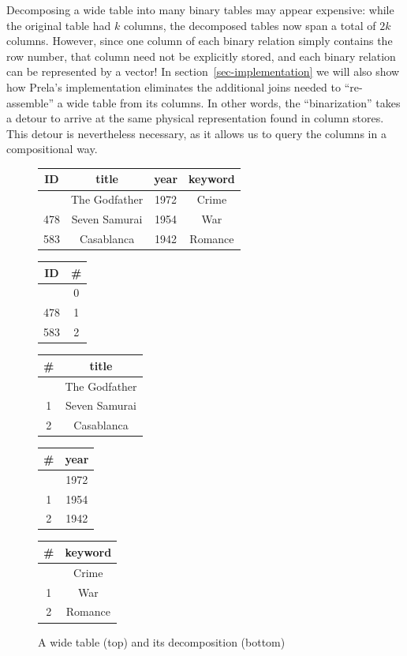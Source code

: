 \documentclass[sigconf,screen,pbalance]{cidr-2027}
\newenvironment{reltable}[1]
  {\begingroup\setlength{\arrayrulewidth}{0.5pt}\setlength{\tabcolsep}{4pt}%
   \renewcommand{\arraystretch}{0.95}\begin{tabular}{#1}\hline}
  {\\\hline\end{tabular}\endgroup}
\newcommand{\headergap}{\\\hline\noalign{\vskip 2pt}\hline}
\begin{document}
Decomposing a wide table into many binary tables may appear expensive: while the original table had $k$ columns, the decomposed tables now span a total of $2k$ columns.
However, since one column of each binary relation simply contains the row number, that column need not be explicitly stored, and each binary relation can be represented by a vector!
In section~\ref{sec-implementation} we will also show how Prela's implementation eliminates the additional joins needed to ``re-assemble'' a wide table from its columns.
In other words, the ``binarization'' takes a detour to arrive at the same physical representation found in column stores.
This detour is nevertheless necessary, as it allows us to query the columns in a compositional way.

\begin{figure}
\centering
\begin{reltable}{|c|c|c|c|}
ID & title & year & keyword \headergap
646 & The Godfather & 1972 & Crime \\\hline
478 & Seven Samurai & 1954 & War \\\hline
583 & Casablanca & 1942 & Romance
\end{reltable}

\vspace{0.6em}
\begin{reltable}{|c|c|}
ID & \# \headergap
646 & 0 \\\hline 478 & 1 \\\hline 583 & 2
\end{reltable}\hspace{2.5pt}%
\begin{reltable}{|c|c|}
\# & title \headergap
0 & The Godfather \\\hline 1 & Seven Samurai \\\hline 2 & Casablanca
\end{reltable}\hspace{2.5pt}%
\begin{reltable}{|c|c|}
\# & year \headergap
0 & 1972 \\\hline 1 & 1954 \\\hline 2 & 1942
\end{reltable}\hspace{2.5pt}%
\begin{reltable}{|c|c|}
\# & keyword \headergap
0 & Crime \\\hline 1 & War \\\hline 2 & Romance
\end{reltable}
\caption{A wide table (top) and its decomposition (bottom)}
\label{fig-decomposition}
\end{figure}
\end{document}
